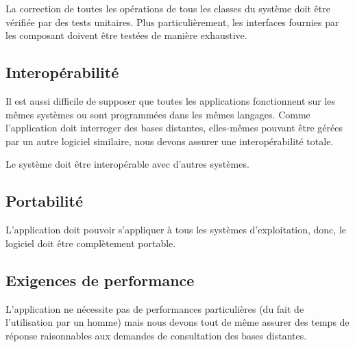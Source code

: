 \begin{requirement}[Correction]
	La correction de toutes les opérations de tous les classes du système doit être vérifiée par des tests unitaires. 
	Plus particulièrement, les interfaces fournies par les composant doivent être testées de manière exhaustive.
\end{requirement}


 \subsection{Interopérabilité}
Il est aussi difficile de supposer que toutes les applications fonctionnent sur les mêmes systèmes ou sont programmées dans les mêmes langages.
Comme l'application doit interroger des bases distantes, elles-mêmes pouvant être gérées par un autre logiciel similaire, nous devons assurer une interopérabilité totale. 
 
\begin{requirement}[Interopérabilité]
	Le système doit être interopérable avec d'autres systèmes.
\end{requirement}
 

\subsection{Portabilité}
\begin{requirement}[Portabilité]
	L'application doit pouvoir s'appliquer à tous les systèmes d'exploitation, donc, le logiciel doit être complètement portable.
\end{requirement}



\subsection{Exigences de performance}
L'application ne nécessite pas de performances particulières (du fait de l'utilisation par un homme) mais nous devons tout de même assurer des temps de réponse raisonnables aux demandes de consultation des bases distantes.
	

